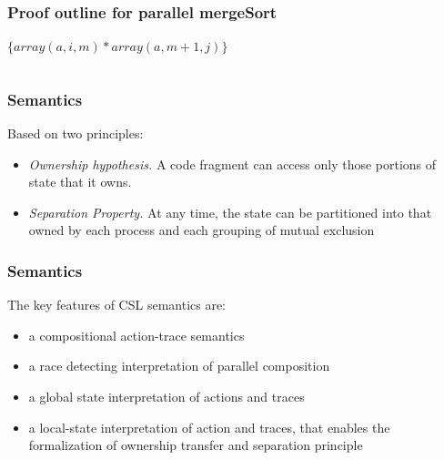 \documentclass{beamer}
\begin{document}
    \begin{frame}
        \frametitle{Proof outline for parallel mergeSort}
        \begin{center}
        \hspace{-20mm}$\{array(a,i,m) \ast array(a,m+1,j)\}$
        \end{center}
        \begin{columns}[T]
            \begin{column}{.5\textwidth}
                    

                    
            \end{column}
            \begin{column}{.5\textwidth}
                
                
            \end{column}
        \end{columns}
        \begin{center}
        \end{center}
    \end{frame}
    \begin{frame}
        \frametitle{Semantics}
         Based on two principles: \begin{itemize}
             \item \emph{Ownership hypothesis.} A code fragment can access only those portions 
             of state that it owns.
             \item  \emph{Separation Property.} At any time, the state can be partitioned  into that owned by each process 
             and each grouping of mutual exclusion
         \end{itemize}
    \end{frame}
    \begin{frame}
        \frametitle{Semantics}
        The key features of CSL semantics are: \begin{itemize}
            \item a compositional action-trace semantics 
            \item a race detecting interpretation of parallel composition 
            \item a global state interpretation  of actions and traces 
            \item a local-state interpretation of action and traces, that enables the formalization 
            of ownership transfer and separation principle
        \end{itemize}
    \end{frame}
\end{document}

